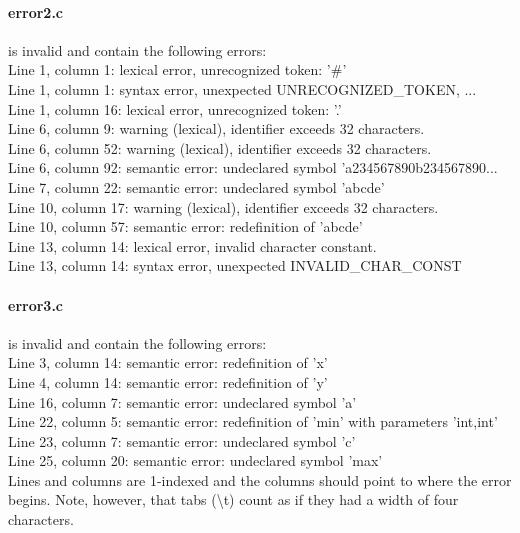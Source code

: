 \paragraph{error2.c} is invalid and contain the following errors: \\
Line 1, column 1: lexical error, unrecognized token: '\#' \\
Line 1, column 1: syntax error, unexpected UNRECOGNIZED\_TOKEN, ... \\
Line 1, column 16: lexical error, unrecognized token: '.' \\
Line 6, column 9: warning (lexical), identifier exceeds 32 characters. \\
Line 6, column 52: warning (lexical), identifier exceeds 32 characters. \\
Line 6, column 92: semantic error: undeclared symbol 'a234567890b234567890... \\
Line 7, column 22: semantic error: undeclared symbol 'abcde' \\
Line 10, column 17: warning (lexical), identifier exceeds 32 characters. \\
Line 10, column 57: semantic error: redefinition of 'abcde' \\
Line 13, column 14: lexical error, invalid character constant. \\
Line 13, column 14: syntax error, unexpected INVALID\_CHAR\_CONST \\

\paragraph{error3.c} is invalid and contain the following errors: \\
Line 3, column 14: semantic error: redefinition of 'x' \\
Line 4, column 14: semantic error: redefinition of 'y' \\
Line 16, column 7: semantic error: undeclared symbol 'a' \\
Line 22, column 5: semantic error: redefinition of 'min' with parameters 'int,int' \\
Line 23, column 7: semantic error: undeclared symbol 'c' \\
Line 25, column 20: semantic error: undeclared symbol 'max' \\


Lines and columns are 1-indexed and the columns should point to where the error begins.
Note, however, that tabs (\textbackslash t) count as if they had a width of four characters.
